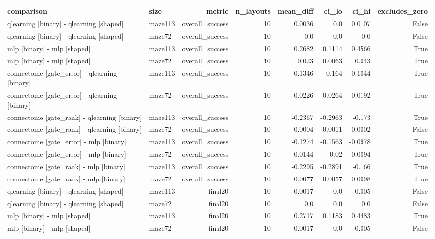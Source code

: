 \begin{table}[t]
\centering
\small
\begin{tabular}{llrrrrrr}
\toprule
comparison & size & metric & n\_layouts & mean\_diff & ci\_lo & ci\_hi & excludes\_zero \\
\midrule
qlearning [binary] - qlearning [shaped] & maze113 & overall\_success & 10 & 0.0036 & 0.0 & 0.0107 & False \\
qlearning [binary] - qlearning [shaped] & maze72 & overall\_success & 10 & 0.0 & 0.0 & 0.0 & False \\
mlp [binary] - mlp [shaped] & maze113 & overall\_success & 10 & 0.2682 & 0.1114 & 0.4566 & True \\
mlp [binary] - mlp [shaped] & maze72 & overall\_success & 10 & 0.023 & 0.0063 & 0.043 & True \\
connectome [gate\_error] - qlearning [binary] & maze113 & overall\_success & 10 & -0.1346 & -0.164 & -0.1044 & True \\
connectome [gate\_error] - qlearning [binary] & maze72 & overall\_success & 10 & -0.0226 & -0.0264 & -0.0192 & True \\
connectome [gate\_rank] - qlearning [binary] & maze113 & overall\_success & 10 & -0.2367 & -0.2963 & -0.173 & True \\
connectome [gate\_rank] - qlearning [binary] & maze72 & overall\_success & 10 & -0.0004 & -0.0011 & 0.0002 & False \\
connectome [gate\_error] - mlp [binary] & maze113 & overall\_success & 10 & -0.1274 & -0.1563 & -0.0978 & True \\
connectome [gate\_error] - mlp [binary] & maze72 & overall\_success & 10 & -0.0144 & -0.02 & -0.0094 & True \\
connectome [gate\_rank] - mlp [binary] & maze113 & overall\_success & 10 & -0.2295 & -0.2891 & -0.166 & True \\
connectome [gate\_rank] - mlp [binary] & maze72 & overall\_success & 10 & 0.0077 & 0.0057 & 0.0098 & True \\
qlearning [binary] - qlearning [shaped] & maze113 & final20 & 10 & 0.0017 & 0.0 & 0.005 & False \\
qlearning [binary] - qlearning [shaped] & maze72 & final20 & 10 & 0.0 & 0.0 & 0.0 & False \\
mlp [binary] - mlp [shaped] & maze113 & final20 & 10 & 0.2717 & 0.1183 & 0.4483 & True \\
mlp [binary] - mlp [shaped] & maze72 & final20 & 10 & 0.0017 & 0.0 & 0.005 & False \\

\end{tabular}
\end{table}
